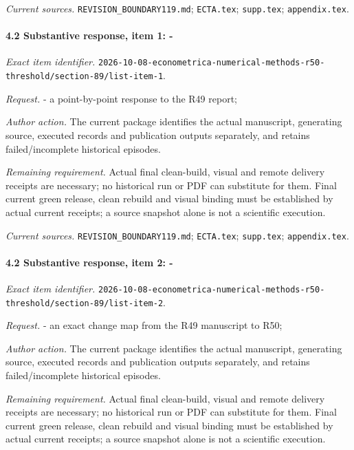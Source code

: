 \par\emph{Current sources.} \nolinkurl{REVISION_BOUNDARY119.md}; \nolinkurl{ECTA.tex}; \nolinkurl{supp.tex}; \nolinkurl{appendix.tex}.

\paragraph{4.2 Substantive response, item 1: -}

\emph{Exact item identifier.} \nolinkurl{2026-10-08-econometrica-numerical-methods-r50-threshold/section-89/list-item-1}.

\par\emph{Request.} - a point-by-point response to the R49 report;

\par\emph{Author action.} The current package identifies the actual manuscript, generating source, executed records and publication outputs separately, and retains failed/\allowbreak{}incomplete historical episodes.

\par\emph{Remaining requirement.} Actual final clean-build, visual and remote delivery receipts are necessary; no historical run or PDF can substitute for them. Final current green release, clean rebuild and visual binding must be established by actual current receipts; a source snapshot alone is not a scientific execution.

\par\emph{Current sources.} \nolinkurl{REVISION_BOUNDARY119.md}; \nolinkurl{ECTA.tex}; \nolinkurl{supp.tex}; \nolinkurl{appendix.tex}.

\paragraph{4.2 Substantive response, item 2: -}

\emph{Exact item identifier.} \nolinkurl{2026-10-08-econometrica-numerical-methods-r50-threshold/section-89/list-item-2}.

\par\emph{Request.} - an exact change map from the R49 manuscript to R50;

\par\emph{Author action.} The current package identifies the actual manuscript, generating source, executed records and publication outputs separately, and retains failed/\allowbreak{}incomplete historical episodes.

\par\emph{Remaining requirement.} Actual final clean-build, visual and remote delivery receipts are necessary; no historical run or PDF can substitute for them. Final current green release, clean rebuild and visual binding must be established by actual current receipts; a source snapshot alone is not a scientific execution.

